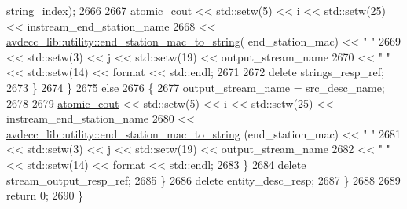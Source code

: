 \begin{DoxyCode}
      string\_index);
2666 
2667                     \hyperlink{cmd__line_8h_a0bc38ccc65c79ba06c6fcd7b4bf554c3}{atomic\_cout} << std::setw(5) << i << std::setw(25) << 
      instream\_end\_station\_name
2668                                 << 
      \hyperlink{namespaceavdecc__lib_1_1utility_a5a8f858065c29351840fac0842d82450}{avdecc\_lib::utility::end\_station\_mac\_to\_string}(
      end\_station\_mac) << \textcolor{stringliteral}{"   "}
2669                                 << std::setw(3) << j << std::setw(19) << output\_stream\_name
2670                                 << \textcolor{stringliteral}{"   "} << std::setw(14) << format << std::endl;
2671 
2672                     \textcolor{keyword}{delete} strings\_resp\_ref;
2673                 \}
2674             \}
2675             \textcolor{keywordflow}{else}
2676             \{
2677                 output\_stream\_name = src\_desc\_name;
2678 
2679                 \hyperlink{cmd__line_8h_a0bc38ccc65c79ba06c6fcd7b4bf554c3}{atomic\_cout} << std::setw(5) << i << std::setw(25) << instream\_end\_station\_name
2680                             << \hyperlink{namespaceavdecc__lib_1_1utility_a5a8f858065c29351840fac0842d82450}{avdecc\_lib::utility::end\_station\_mac\_to\_string}
      (end\_station\_mac) << \textcolor{stringliteral}{"   "}
2681                             << std::setw(3) << j << std::setw(19) << output\_stream\_name
2682                             << \textcolor{stringliteral}{"   "} << std::setw(14) << format << std::endl;
2683             \}
2684             \textcolor{keyword}{delete} stream\_output\_resp\_ref;
2685         \}
2686         \textcolor{keyword}{delete} entity\_desc\_resp;
2687     \}
2688 
2689     \textcolor{keywordflow}{return} 0;
2690 \}
\end{DoxyCode}


